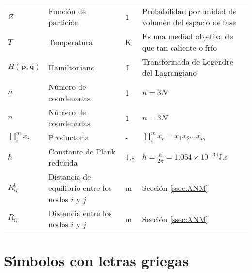 \begin{longtable}{p{2cm}p{4cm}p{2cm}p{8cm}}
$Z$  &Funci\'{o}n de partici\'{o}n&\hspace{6pt}1 &Probabilidad por unidad de volumen del espacio de fase\\%
$T$ &Temperatura &\hspace{6pt}K &Es una mediad objetiva de que tan caliente o fr\'{i}o\\%
$H(\mathbf{p},\mathbf{q})$ &Hamiltoniano  &\hspace{6pt}J &Transformada de Legendre del Lagrangiano\\%
$n$ &N\'{u}mero de coordenadas    &\hspace{6pt}1 &$n=3N$\\%
$n$&N\'{u}mero de coordenadas   &\hspace{6pt}1 &$n=3N$\\%
$\prod_i^m x_i$&Productoria&\hspace{6pt}-&$\prod_i^m x_i=x_1x_2...x_m$\\%
$\hbar$&Constante de Plank reducida &\hspace{6pt}J.s &$\hbar=\frac{h}{2\pi}=1.054\times 10^{-34}$J.s\\%
$R_{ij}^0$&Distancia de equilibrio entre los nodos $i$ y $j$ &\hspace{6pt}m&Secci\'{o}n \ref{ssec:ANM}\\%
$R_{ij}$&Distancia entre los nodos $i$ y $j$ &\hspace{6pt}m&Secci\'{o}n \ref{ssec:ANM}\\%
\end{longtable}
\vspace{5ex}
\section*{S\'{\i}mbolos con letras griegas}


